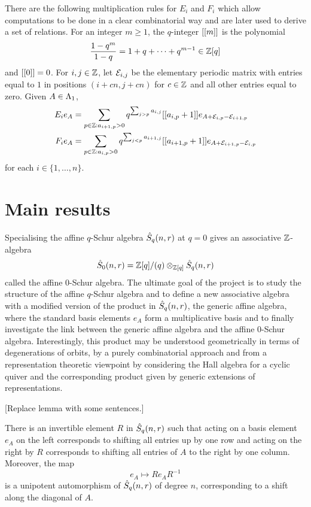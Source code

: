 \documentclass[a4paper, 11pt]{report}
\begin{document}
There are the following multiplication rules for $E_i$ and $F_i$ which allow computations to be done in a clear combinatorial way and are later used to derive a set of relations. For an integer $m\geq 1$, the $q$-integer $[[m]]$ is the polynomial
\begin{equation*}
\frac{1-q^m}{1-q} = 1 + q +\cdots + q^{m-1}\in\mathbb{Z}[q]
\end{equation*}
and $[[0]]=0$. For $i,j\in\mathbb{Z}$, let $\mathcal{E}_{i,j}$ be the elementary periodic matrix with entries equal to $1$ in positions $(i+cn,j+cn)$ for $c\in\mathbb{Z}$ and all other entries equal to zero. Given $A\in\Lambda_1{}$,
\begin{align*}
E_ie_A &= \sum_{p\in\mathbb{Z}:a_{i+1,p}>0} q^{\sum_{j>p}a_{i,j}} [[a_{i,p}+1]] e_{A+\mathcal{E}_{i,p} -\mathcal{E}_{i+1,p}}\\
F_ie_A &= \sum_{p\in\mathbb{Z}:a_{i,p}>0} q^{\sum_{j<p}a_{i+1,j}} [[a_{i+1,p}+1]] e_{A+\mathcal{E}_{i+1,p} -\mathcal{E}_{i,p}}
\end{align*}
for each $i\in\{1,\ldots,n\}$.


\section{Main results}

Specialising the affine $q$-Schur algebra $\hat{S}_q(n,r)$ at $q=0$ gives an associative $\mathbb{Z}$-algebra
\begin{equation*}
\hat{S}_0(n,r) = \mathbb{Z}[q]/{(q)}\otimes_{\mathbb{Z}[q]}\hat{S}_q(n,r)
\end{equation*}
called the affine $0$-Schur algebra. The ultimate goal of the project is to study the structure of the affine $q$-Schur algebra and to define a new associative algebra with a modified version of the product in $\hat{S}_q(n,r)$, the generic affine algebra, where the standard basis elements $e_A$ form a multiplicative basis and to finally investigate the link between the generic affine algebra and the affine $0$-Schur algebra. Interestingly, this product may be understood geometrically in terms of degenerations of orbits, by a purely combinatorial approach and from a representation theoretic viewpoint by considering the Hall algebra for a cyclic quiver and the corresponding product given by generic extensions of representations.

[Replace lemma with some sentences.]
\begin{lemma*}
There is an invertible element $R$ in $\hat{S}_q(n,r)$ such that acting on a basis element $e_A$ on the left corresponds to shifting all entries up by one row and acting on the right by $R$ corresponds to shifting all entries of $A$ to the right by one column. Moreover, the map
\begin{equation*}
e_A\mapsto Re_A R^{-1}
\end{equation*}
is a unipotent automorphism of $\hat{S}_q(n,r)$ of degree $n$, corresponding to a shift along the diagonal of $A$.
\end{lemma*}
\end{document}
